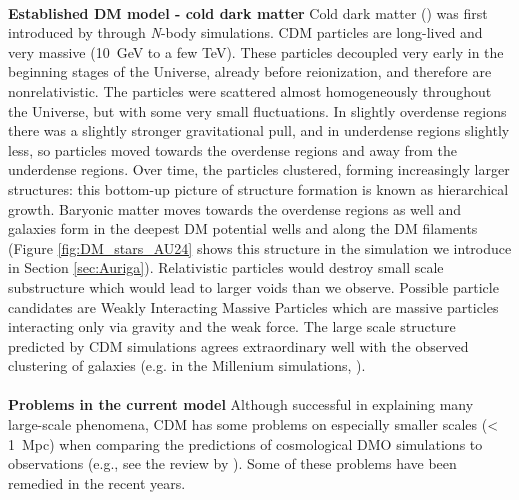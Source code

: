 \\\textbf{Established \ac{DM} model - cold dark matter}
Cold dark matter () was first introduced by \cite{Davis....CDM...1985} through \textit{N}-body simulations. \ac{CDM} particles are long-lived and very massive (\SI{10}{GeV} to a few TeV). These particles decoupled very early in the beginning stages of the Universe, already before reionization, and therefore are nonrelativistic. The particles were scattered almost homogeneously throughout the Universe, but with some very small fluctuations. In slightly overdense regions there was a slightly stronger gravitational pull, and in underdense regions slightly less, so particles moved towards the overdense regions and away from the underdense regions. Over time, the particles clustered, forming increasingly larger structures: this bottom-up picture of structure formation is known as hierarchical growth. Baryonic matter moves towards the overdense regions as well and galaxies form in the deepest \ac{DM} potential wells and along the \ac{DM} filaments (Figure \ref{fig:DM_stars_AU24} shows this structure in the simulation we introduce in Section \ref{sec:Auriga}). Relativistic particles would destroy small scale substructure which would lead to larger voids than we observe. Possible particle candidates are Weakly Interacting Massive Particles which are massive particles interacting only via gravity and the weak force. The large scale structure predicted by \ac{CDM} simulations agrees extraordinary well with the observed clustering of galaxies (e.g. in the Millenium simulations, \citealp{Springel...Millenium...2005}). \\
\\\textbf{Problems in the current model}
Although successful in explaining many large-scale phenomena, \ac{CDM} has some problems on especially smaller scales (< \SI{1}{Mpc}) when comparing the predictions of cosmological \ac{DMO} simulations to observations (e.g., see the review by \citealp{Bullock...LCDMprobs...2017}). Some of these problems have been remedied in the recent years.
